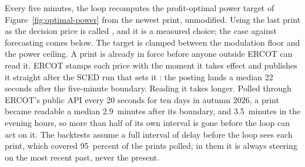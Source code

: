 Every five minutes, the loop recomputes the profit-optimal power target of Figure~\ref{fig:optimal-power} from the newest print, unmodified. Using the last print as the decision price is called , and it is a measured choice; the case against forecasting comes below. The target is clamped between the modulation floor and the power ceiling. A print is already in force before anyone outside ERCOT can read it. ERCOT stamps each price with the moment it takes effect and publishes it straight after the SCED run that sets it \autocite{ercot2026protocols}: the posting lands a median 22 seconds after the five-minute boundary. %
Reading it takes longer. Polled through ERCOT's public API every 20 seconds for ten days in autumn 2026, a print became readable a median 2.9~minutes after its boundary, and 3.5~minutes in the evening hours, so more than half of its own interval is gone before the loop can act on it. %
The backtests assume a full interval of delay before the loop sees each print, which covered 95~percent of the prints polled; in them it is always steering on the most recent past, never the present. %


